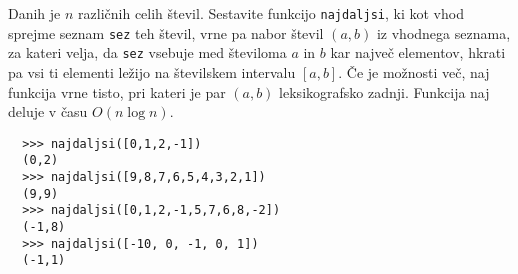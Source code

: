 \documentclass[arhiv]{../izpit}
\begin{document}

  Danih je $n$ različnih celih števil. Sestavite funkcijo \texttt{najdaljsi}, ki
  kot vhod sprejme seznam \texttt{sez} teh števil, vrne pa nabor števil $(a,b)$
  iz vhodnega seznama, za kateri velja, da \texttt{sez} vsebuje med številoma
  $a$ in $b$ kar največ elementov, hkrati pa vsi ti elementi ležijo na
  številskem intervalu $[a,b]$. Če je možnosti več, naj funkcija vrne tisto, pri
  kateri je par $(a,b)$ leksikografsko zadnji. Funkcija naj deluje v času $O(n
  \log n)$.

  \begin{verbatim}
  >>> najdaljsi([0,1,2,-1])
  (0,2)
  >>> najdaljsi([9,8,7,6,5,4,3,2,1])
  (9,9)
  >>> najdaljsi([0,1,2,-1,5,7,6,8,-2])
  (-1,8)
  >>> najdaljsi([-10, 0, -1, 0, 1])
  (-1,1)
  \end{verbatim}  
\end{document}
